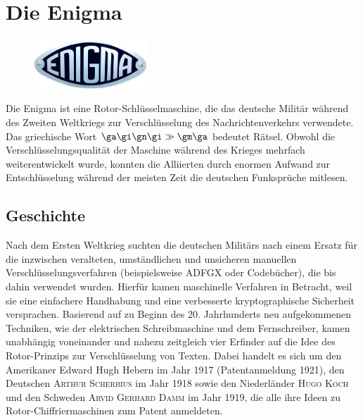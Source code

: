\documentclass[%
11pt,%
twoside,%
titlepage,%
german,%
headsepline%
]{scrartcl}
\begin{document}
\section{Die Enigma}
\begin{figure}
\vspace{-15pt}
  \begin{center}
    \includegraphics[width=0.38\textwidth]{pictures/enigmalogo}
  \end{center}
\vspace{-0pt}
\end{figure}
Die Enigma ist eine Rotor-Schlüsselmaschine, die das deutsche Militär während des Zweiten Weltkriegs zur Verschlüsselung des Nachrichtenverkehrs verwendete. Das griechische Wort $\ga\gi\gn\gi\gg\gm\ga$ bedeutet \glqq Rätsel\grqq. Obwohl die Verschlüsselungsqualität der Maschine während des Krieges mehrfach weiterentwickelt wurde, konnten die Alliierten durch enormen Aufwand zur Entschlüsselung während der meisten Zeit die deutschen Funksprüche mitlesen.

\subsection{Geschichte}

Nach dem Ersten Weltkrieg suchten die deutschen Militärs nach einem Ersatz für die inzwischen veralteten, umständlichen und unsicheren manuellen Verschlüsselungsverfahren (beispielsweise ADFGX oder Codebücher), die bis dahin verwendet wurden. Hierfür kamen maschinelle Verfahren in Betracht, weil sie eine einfachere Handhabung und eine verbesserte kryptographische Sicherheit versprachen. Basierend auf zu Beginn des 20. Jahrhunderts neu aufgekommenen Techniken, wie der elektrischen Schreibmaschine und dem Fernschreiber, kamen unabhängig voneinander und nahezu zeitgleich vier Erfinder auf die Idee des Rotor-Prinzips zur Verschlüsselung von Texten. Dabei handelt es sich um den Amerikaner Edward Hugh Hebern im Jahr 1917 (Patentanmeldung 1921), den Deutschen \textsc{Arthur Scherbius} im Jahr 1918 sowie den Niederländer \textsc{Hugo Koch} und den Schweden \textsc{Arvid Gerhard Damm} im Jahr 1919, die alle ihre Ideen zu Rotor-Chiffriermaschinen zum Patent anmeldeten.
\end{document}
